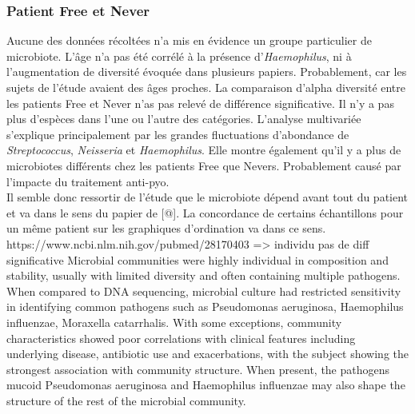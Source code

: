 \documentclass[12pt,a4paper]{article}
\begin{document}
\subsubsection{Patient Free et Never}
Aucune des données récoltées n’a mis en évidence un groupe particulier de microbiote. L’âge n’a pas été corrélé à la présence d’\textit{Haemophilus}, ni à l’augmentation de diversité évoquée dans plusieurs papiers. Probablement, car les sujets de l'étude avaient des âges proches. La comparaison d'alpha diversité entre les patients Free et Never n'as pas relevé de différence significative. Il n'y a pas plus d'espèces dans l'une ou l'autre des catégories. 
L'analyse multivariée s'explique principalement par les grandes fluctuations d'abondance de \textit{Streptococcus}, \textit{Neisseria} et \textit{Haemophilus}. Elle montre également qu'il y a plus de microbiotes différents chez les patients Free que Nevers. Probablement causé par l'impacte du traitement anti-pyo.  \\
Il semble donc ressortir de l'étude que le microbiote dépend avant tout du patient et va dans le sens du papier de [@]. La concordance de certains échantillons pour un même patient sur les graphiques d'ordination va dans ce sens. 
https://www.ncbi.nlm.nih.gov/pubmed/28170403 => individu pas de diff significative
Microbial communities were highly individual in composition and stability, usually with limited diversity and often containing multiple pathogens. When compared to DNA sequencing, microbial culture had restricted sensitivity in identifying common pathogens such as Pseudomonas aeruginosa, Haemophilus influenzae, Moraxella catarrhalis. With some exceptions, community characteristics showed poor correlations with clinical features including underlying disease, antibiotic use and exacerbations, with the subject showing the strongest association with community structure. When present, the pathogens mucoid Pseudomonas aeruginosa and Haemophilus influenzae may also shape the structure of the rest of the microbial community.
\end{document}
